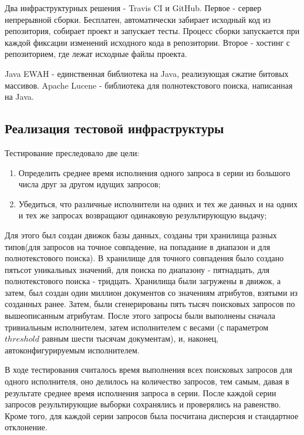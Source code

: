 \documentclass{matmex-diploma}
\begin{document}
\begin{enumerate}
        Два инфраструктурных решения - Travis CI и GitHub. Первое - сервер непрерывной сборки. Бесплатен, автоматически забирает исходный код из репозитория, собирает проект и запускает тесты. Процесс сборки запускается при каждой фиксации изменений исходного кода в репозитории. Второе - хостинг с репозиторием, где лежат исходные файлы проекта. 
        
        Java EWAH - единственная библиотека на Java, реализующая сжатие битовых массивов. Apache Lucene - библиотека для полнотекстового поиска, написанная на Java.
        \end{enumerate}
    \subsection{Реализация тестовой инфраструктуры}
        Тестирование преследовало две цели:
            \begin{enumerate}
                \item Определить среднее время исполнения одного запроса в серии из большого числа друг за другом идущих запросов;
                \item Убедиться, что различные исполнители на одних и тех же данных и на одних и тех же запросах возвращают одинаковую результирующую выдачу;
            \end{enumerate}
        Для этого был создан движок базы данных, созданы три хранилища разных типов(для запросов на точное совпадение, на попадание в диапазон и для полнотекстового поиска). В хранилище для точного совпадения было создано пятьсот уникальных значений, для поиска по диапазону - пятнадцать, для полнотекстового поиска - тридцать. Хранилища были загружены в движок, а затем, был создан один миллион документов со значениям атрибутов, взятыми из созданных ранее. Затем, были сгенерированы пять тысяч поисковых запросов по вышеописанным атрибутам. После этого запросы были выполнены сначала тривиальным исполнителем, затем исполнителем с весами (с параметром $threshold$ равным шести тысячам документам), и, наконец, автоконфигурируемым исполнителем. 
            
        В ходе тестирования считалось время выполнения всех поисковых запросов для одного исполнителя, оно делилось на количество запросов, тем самым, давая в результате среднее время исполнения запроса в серии. После каждой серии запросов результирующие выборки сохранялись и проверялись на равенство. Кроме того, для каждой серии запросов была посчитана дисперсия и стандартное отклонение.
        
\end{document}
